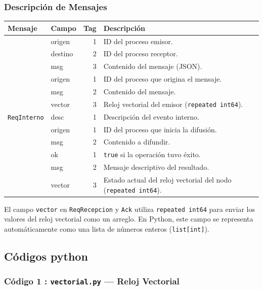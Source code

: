 \documentclass[letterpaper,11pt]{article}
\begin{document}
\subsubsection{Descripción de Mensajes}
 
\begin{center}
\begin{tabular}{>{\ttfamily}l >{\ttfamily}l r p{5.5cm}}
\toprule
\textbf{Mensaje} & \textbf{Campo} & \textbf{Tag} & \textbf{Descripción} \\
\midrule
\multirow{3}{*}{\texttt{ReqEnvio}}
  & origen  & 1 & ID del proceso emisor. \\
  & destino & 2 & ID del proceso receptor. \\
  & msg     & 3 & Contenido del mensaje (JSON). \\
\midrule
\multirow{3}{*}{\texttt{ReqRecepcion}}
  & origen & 1 & ID del proceso que origina el mensaje. \\
  & msg    & 2 & Contenido del mensaje. \\
  & vector & 3 & Reloj vectorial del emisor (\texttt{repeated int64}). \\
\midrule
\texttt{ReqInterno}
  & desc & 1 & Descripción del evento interno. \\
\midrule
\multirow{2}{*}{\texttt{ReqDifusion}}
  & origen & 1 & ID del proceso que inicia la difusión. \\
  & msg    & 2 & Contenido a difundir. \\
\midrule
\multirow{3}{*}{\texttt{Ack}}
  & ok     & 1 & \texttt{true} si la operación tuvo éxito. \\
  & msg    & 2 & Mensaje descriptivo del resultado. \\
  & vector & 3 & Estado actual del reloj vectorial del nodo (\texttt{repeated int64}). \\
\bottomrule
\end{tabular}
\end{center}


 El campo \texttt{vector} en \texttt{ReqRecepcion} y \texttt{Ack} utiliza 
\texttt{repeated int64} para enviar los valores del reloj vectorial como un 
arreglo. En Python, este campo se representa automáticamente como una lista 
de números enteros (\texttt{list[int]}).


\newpage
\subsection{Códigos python}
\subsubsection{Código 1 : \texttt{vectorial.py} — Reloj Vectorial}
\end{document}
